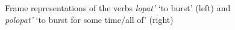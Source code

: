 
 \begin{figure}
\hfill{}
\hfill%
\hfill%
\caption{Frame representations of the verbs \textit{lopat'} `to burst' (left) and \textit{polopat'} `to burst for some time/all of' (right) \label{frame:lopat}}
\end{figure}
 
